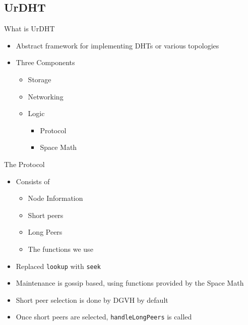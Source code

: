 \documentclass[11pt]{beamer}
\begin{document}
\subsection{UrDHT}

\begin{frame}{What is UrDHT}
	\begin{itemize}
		\item Abstract framework for implementing DHTs or various topologies
		\item Three Components
		\begin{itemize}
			\item Storage 
			\item Networking
			\item Logic
			\begin{itemize}
				\item Protocol
				\item Space Math
			\end{itemize}
		\end{itemize}
	\end{itemize}
\end{frame}



\begin{frame}{The Protocol}

	\begin{itemize}
		\item Consists of
		\begin{itemize}
			\item Node Information
			\item Short peers
			\item Long Peers
			\item The functions we use
		\end{itemize}
		\item Replaced \texttt{lookup} with \texttt{seek}
		\item Maintenance is gossip based, using functions provided by the Space Math
		\item Short peer selection is done by DGVH by default
		\item Once short peers are selected, \texttt{handleLongPeers} is called
	\end{itemize}
\end{frame}
\end{document}
